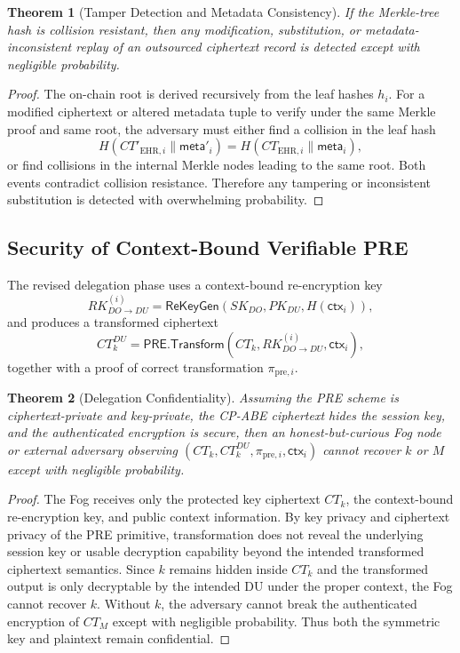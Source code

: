 \documentclass[conference]{IEEEtran}
\newtheorem{theorem}{Theorem}
\begin{document}
\begin{theorem}[Tamper Detection and Metadata Consistency]
If the Merkle-tree hash is collision resistant, then any modification, substitution, or metadata-inconsistent replay of an outsourced ciphertext record is detected except with negligible probability.
\end{theorem}

\begin{proof}
The on-chain root is derived recursively from the leaf hashes $h_i$. For a modified ciphertext or altered metadata tuple to verify under the same Merkle proof and same root, the adversary must either find a collision in the leaf hash
\[
H(CT'_{\mathrm{EHR},i}\|\mathsf{meta}'_i)
=
H(CT_{\mathrm{EHR},i}\|\mathsf{meta}_i),
\]
or find collisions in the internal Merkle nodes leading to the same root. Both events contradict collision resistance. Therefore any tampering or inconsistent substitution is detected with overwhelming probability.
\end{proof}

\subsection{Security of Context-Bound Verifiable PRE}

The revised delegation phase uses a context-bound re-encryption key
\[
RK_{DO\rightarrow DU}^{(i)}=\textsf{ReKeyGen}(SK_{DO},PK_{DU},H(\mathsf{ctx}_i)),
\]
and produces a transformed ciphertext
\[
CT_k^{DU}=\textsf{PRE.Transform}(CT_k,RK_{DO\rightarrow DU}^{(i)},\mathsf{ctx}_i),
\]
together with a proof of correct transformation $\pi_{\mathrm{pre},i}$.

\begin{theorem}[Delegation Confidentiality]
Assuming the PRE scheme is ciphertext-private and key-private, the CP-ABE ciphertext hides the session key, and the authenticated encryption is secure, then an honest-but-curious Fog node or external adversary observing $(CT_k,CT_k^{DU},\pi_{\mathrm{pre},i},\mathsf{ctx}_i)$ cannot recover $k$ or $M$ except with negligible probability.
\end{theorem}

\begin{proof}
The Fog receives only the protected key ciphertext $CT_k$, the context-bound re-encryption key, and public context information. By key privacy and ciphertext privacy of the PRE primitive, transformation does not reveal the underlying session key or usable decryption capability beyond the intended transformed ciphertext semantics. Since $k$ remains hidden inside $CT_k$ and the transformed output is only decryptable by the intended DU under the proper context, the Fog cannot recover $k$. Without $k$, the adversary cannot break the authenticated encryption of $CT_M$ except with negligible probability. Thus both the symmetric key and plaintext remain confidential.
\end{proof}
\end{document}
